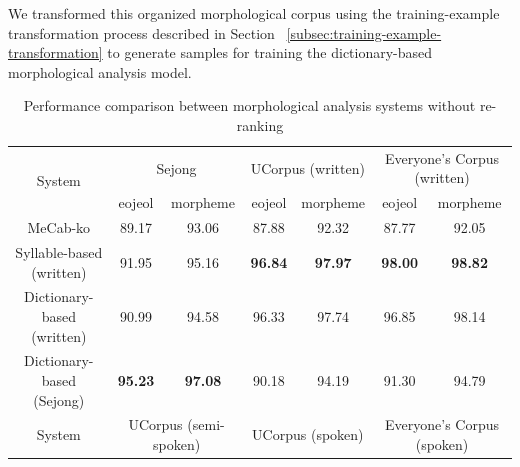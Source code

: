 \documentclass[AMS,STIX2COL]{WileyNJD-v2}
\begin{document}
    We transformed this organized morphological corpus using the training-example transformation process described in Section ~\ref{subsec:training-example-transformation} to generate samples for training the dictionary-based morphological analysis model.

    \begin{table}[]
        \caption{Performance comparison between morphological analysis systems without re-ranking}\label{tab:performance-without-reranking}
        \begin{tabular*}{500pt}{@{\extracolsep\fill}c|cccccc@{\extracolsep\fill}}
            \toprule
            \multirow{2}{*}{System}                & \multicolumn{2}{c}{Sejong}                                & \multicolumn{2}{c}{UCorpus (written)}                     & \multicolumn{2}{c}{Everyone's Corpus (written)}           \\
            \cmidrule{2-3} \cmidrule{4-5} \cmidrule{6-7}
            ~                                      & \multicolumn{1}{c}{eojeol} & \multicolumn{1}{c}{morpheme} & \multicolumn{1}{c}{eojeol} & \multicolumn{1}{c}{morpheme} & \multicolumn{1}{c}{eojeol} & \multicolumn{1}{c}{morpheme} \\
            \midrule
            \hspace{2mm}MeCab-ko                   & 89.17                      & 93.06                        & 87.88                      & 92.32                        & 87.77                      & 92.05                        \\
            \hspace{2mm}Syllable-based (written)   & 91.95                      & 95.16                        & \textbf{96.84}             & \textbf{97.97}               & \textbf{98.00}             & \textbf{98.82}               \\
            \hspace{2mm}Dictionary-based (written) & 90.99                      & 94.58                        & 96.33                      & 97.74                        & 96.85                      & 98.14                        \\
            \hspace{2mm}Dictionary-based (Sejong)  & \textbf{95.23}             & \textbf{97.08}               & 90.18                      & 94.19                        & 91.30                      & 94.79                        \\
            \toprule
            \multirow{2}{*}{System}                & \multicolumn{2}{c}{UCorpus (semi-spoken)}                 & \multicolumn{2}{c}{UCorpus (spoken)}                      & \multicolumn{2}{c}{Everyone's Corpus (spoken)}            \\

\end{tabular*}
\end{table}
\end{document}
